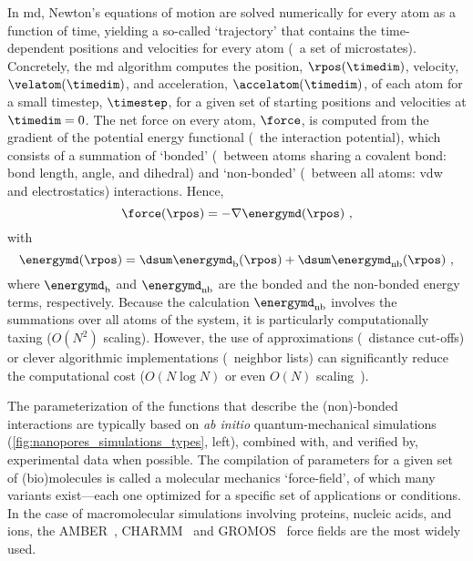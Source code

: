 In \gls{md}, Newton's equations of motion are solved numerically for every atom as a function of time,
yielding a so-called `trajectory' that contains the time-dependent positions and velocities for every atom
(\ie~a set of microstates). Concretely, the \gls{md} algorithm computes the position, $\rpos(\timedim)$,
velocity, $\velatom(\timedim)$, and acceleration, $\accelatom(\timedim)$, of each atom for a small
timestep\footnotemark, $\timestep$, for a given set of starting positions and velocities at $\timedim = 0$.%
%
%
The net force on every atom, $\force$, is computed from the gradient of the potential energy functional
(\ie~the interaction potential), which consists of a summation of `bonded' (\ie~between atoms sharing a
covalent bond: bond length, angle, and dihedral) and `non-bonded' (\ie~between all atoms: \gls{vdw} and
electrostatics) interactions. Hence,
%
\begin{equation}\label{eq:nanopores_md_force}
  \force (\rpos) = - \nabla \energymd (\rpos)
  \text{ ,}
\end{equation}
%
with
%
\begin{equation}\label{eq:nanopores_md_energy}
  \energymd (\rpos) = \dsum \energymd_{\text{b}} (\rpos) + \dsum \energymd_{\text{nb}} (\rpos)
  \text{ ,}
\end{equation}
%
where $\energymd_{\text{b}}$ and $\energymd_{\text{nb}}$ are the bonded and the non-bonded energy terms,
respectively. Because the calculation $\energymd_{\text{nb}}$ involves the summations over all atoms of the
system, it is particularly computationally taxing ($O(N^2)$ scaling). However, the use of approximations
(\eg~distance cut-offs) or clever algorithmic implementations (\eg~neighbor lists) can significantly reduce
the computational cost ($O(N\log N)$ or even $O(N)$ scaling~\cite{Eastman-2010}).

The parameterization of the functions that describe the (non)-bonded interactions are typically based on
\textit{ab initio} quantum-mechanical simulations (\cref{fig:nanopores_simulations_types}, left), combined
with, and verified by, experimental data when possible. The compilation of parameters for a given set of
(bio)molecules is called a molecular mechanics `force-field', of which many variants exist---each one
optimized for a specific set of applications or conditions. In the case of macromolecular simulations
involving proteins, nucleic acids, and ions, the {AMBER}~\cite{Ponder-2003}, {CHARMM}~\cite{Huang-2016} and
{GROMOS}~\cite{Oostenbrink-2004} force fields are the most widely used.


